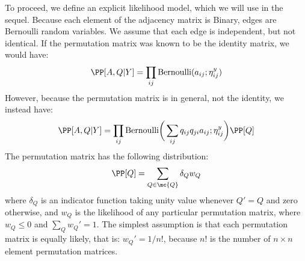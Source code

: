 To proceed, we define an explicit likelihood model, which we will use in the sequel.  Because each element of the adjacency matrix is Binary, edges are Bernoulli random variables.  We assume that each edge is independent, but not identical.  If the permutation matrix was known to be the identity matrix, we would have:
\begin{align}
\PP[A,Q|Y] = \prod_{ij} \text{Bernoulli}(a_{ij}; \eta_{ij}^y)
\end{align}
However, because the permutation matrix is in general, not the identity, we instead have:
\begin{align}
\PP[A,Q|Y] = \prod_{ij} \text{Bernoulli}\bigg(\sum_{ij} q_{ij} q_{ji} a_{ij}; \eta_{ij}^y\bigg) \PP[Q]
\end{align}
The permutation matrix has the following distribution:
\begin{align}
	\PP[Q] = \sum_{Q \in \mc{Q}} \delta_Q w_{Q}
\end{align}
where $\delta_Q$ is an indicator function taking unity value whenever $Q'=Q$ and zero otherwise, and $w_Q$ is the likelihood of any particular permutation matrix, where $w_Q\leq 0$ and $\sum_{Q}w_Q'=1$.  The simplest assumption is that each permutation matrix is equally likely, that is: $w_Q'=1/n!$, because $n!$ is the number of $n\times n$ element permutation matrices.  

